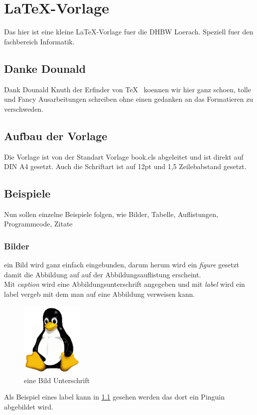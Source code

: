 \chapter{{\LaTeX}-Vorlage}
Das  hier ist eine kleine {\LaTeX}-Vorlage fuer die DHBW Loerach.
Speziell fuer den fachbereich Informatik.

\section{Danke Dounald}
Dank Dounald Knuth\cite{knuth} der Erfinder von \TeX~ koennen wir hier ganz schoen, tolle und Fancy Ausarbeitungen schreiben ohne einen gedanken an das Formatieren zu verschweden.


\newpage
\section{Aufbau der Vorlage}
Die Vorlage ist von der Standart Vorlage book.cls abgeleitet und ist direkt auf DIN A4 gesetzt.
Auch die Schriftart ist auf 12pt und 1,5 Zeilebabstand gesetzt.

\section{Beispiele}
Nun sollen einzelne Beispiele folgen, wie Bilder, Tabelle, Auflistungen, Programmcode, Zitate 

\subsection{Bilder}
ein Bild wird ganz einfach eingebunden, darum herum wird ein \textit{figure}  gesetzt damit die Abbildung auf auf der Abbildungsauflistung erscheint.\\
Mit \textit{caption} wird eine Abbildungsunterschrift angegeben und mit \textit{label} wird ein label vergeb mit dem man auf eine Abbildung verweisen kann.
\begin{figure}[hb] \centering
  \includegraphics[width=3cm]{./img/tux.png}
  \caption{eine Bild Unterschrift}
  \label{tux_1}
\end{figure}
Als Beispiel eines label kann in \ref{tux_1} gesehen werden das dort ein Pinguin abgebildet wird.


